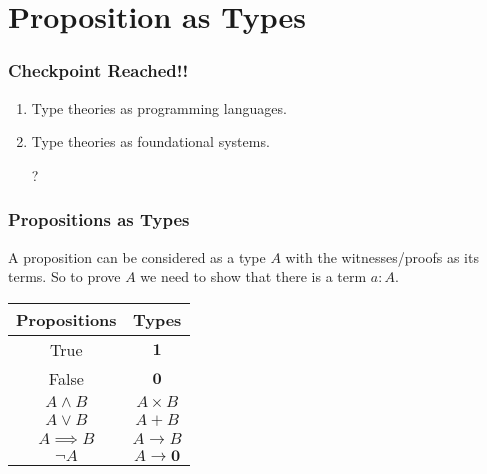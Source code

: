 \documentclass[14pt,compress]{beamer}
\begin{document}
\section{Proposition as Types}
\begin{frame}\label{frame : checkpoint}
\frametitle{Checkpoint Reached!!}

\begin{enumerate}
\pause
\item
Type theories as programming languages.
\pause
\textcolor{beamer@mathtext}
{\begin{Large}  \end{Large}}
\pause
\item
Type theories as foundational systems.
\textcolor{beamer@mathtext}
{\begin{Large} ? \end{Large}}
\end{enumerate}
\end{frame}
\begin{frame}\label{frame : prop as types}
\frametitle{Propositions as Types}

\pause
A proposition can be considered as a type $A$ with 
the witnesses/proofs as its terms.
\pause
So to prove $A$ we need to show that 
there is a term $a : A$.

\pause
\color{beamer@mathtext}
\begin{table}
\begin{tabular}{ c | c }

\hline
Propositions & Types\\ 
\hline

True & $\mathbf{1}$ \\

False & $\mathbf{0}$ \\

$A \wedge B$ & $A \times B$ \\

$A \vee B$ & $A + B$ \\

$A \implies B$ & $A \to B$ \\

$\neg A$ & $A \to \mathbf{0}$ \\
\end{tabular}
\end{table}
\end{frame}
\end{document}
